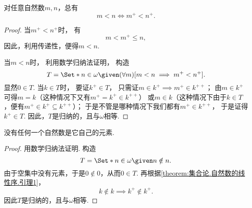 \begin{lemma}\label{theorem:集合论.自然数的线性序.引理1}
对任意自然数\(m,n\)，总有\begin{equation*}
	m < n
	\iff
	m^+ < n^+.
\end{equation*}
\begin{proof}
当\(m^+ < n^+\)时，
有\begin{equation*}
	m < m^+ \leq n,
\end{equation*}
因此，利用传递性，便得\(m < n\).

当\(m < n\)时，
利用数学归纳法证明，
构造\begin{equation*}
	T = \Set*{
		n \in \omega
		\given
		(\forall m)[m < n \implies m^+ < n^+]
	}.
\end{equation*}
显然\(0 \in T\).
当\(k \in T\)时，
要证\(k^+ \in T\)，
只需证\(m \in k^+ \implies m^+ \in k^{++}\)；
由\(m \in k^+\)可得\(m = k\)（这种情况下又有\(m^+ = k^+ \in k^{++}\)）
或\(m \in k\)（这种情况下由于\(k \in T\)，便有\(m^+ \in k^+ \subseteq k^{++}\)）；
于是不管是哪种情况下我们都有\(m^+ \in k^{++}\)，
于是证得\(k^+ \in T\).
因此，\(T\)是归纳的，且与\(\omega\)相等.
\end{proof}
\end{lemma}

\begin{lemma}\label{theorem:集合论.自然数的线性序.引理2}
没有任何一个自然数是它自己的元素.
\begin{proof}
用数学归纳法证明.
构造\begin{equation*}
	T = \Set*{ n \in \omega \given n \notin n }.
\end{equation*}
由于空集中没有元素，于是\(0 \notin 0\)，从而\(0 \in T\).
再根据\cref{theorem:集合论.自然数的线性序.引理1}，\begin{equation*}
	k \notin k
	\implies
	k^+ \notin k^+.
\end{equation*}
因此\(T\)是归纳的，且与\(\omega\)相等.
\end{proof}
\end{lemma}

